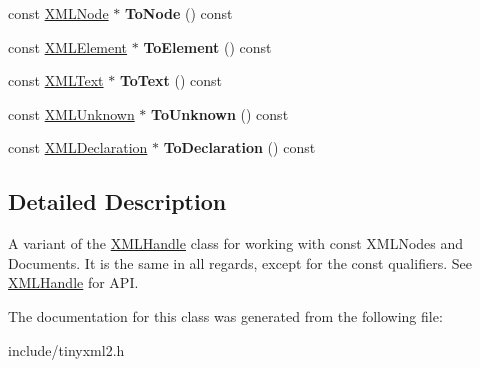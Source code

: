 \begin{DoxyCompactItemize}
\item 
\hypertarget{classtinyxml2_1_1_x_m_l_const_handle_a95d0256318c10c3f75fa5f8ffb3e4bc1}{}const \hyperlink{classtinyxml2_1_1_x_m_l_node}{X\+M\+L\+Node} $\ast$ {\bfseries To\+Node} () const \label{classtinyxml2_1_1_x_m_l_const_handle_a95d0256318c10c3f75fa5f8ffb3e4bc1}

\item 
\hypertarget{classtinyxml2_1_1_x_m_l_const_handle_a5a48adefc2a5e70d4ce5b55692a0e2f9}{}const \hyperlink{classtinyxml2_1_1_x_m_l_element}{X\+M\+L\+Element} $\ast$ {\bfseries To\+Element} () const \label{classtinyxml2_1_1_x_m_l_const_handle_a5a48adefc2a5e70d4ce5b55692a0e2f9}

\item 
\hypertarget{classtinyxml2_1_1_x_m_l_const_handle_ad86ca7dbb20d0495ae357fe7a866e0be}{}const \hyperlink{classtinyxml2_1_1_x_m_l_text}{X\+M\+L\+Text} $\ast$ {\bfseries To\+Text} () const \label{classtinyxml2_1_1_x_m_l_const_handle_ad86ca7dbb20d0495ae357fe7a866e0be}

\item 
\hypertarget{classtinyxml2_1_1_x_m_l_const_handle_acb358a329e54fa204ed2d0b181566828}{}const \hyperlink{classtinyxml2_1_1_x_m_l_unknown}{X\+M\+L\+Unknown} $\ast$ {\bfseries To\+Unknown} () const \label{classtinyxml2_1_1_x_m_l_const_handle_acb358a329e54fa204ed2d0b181566828}

\item 
\hypertarget{classtinyxml2_1_1_x_m_l_const_handle_a5de0c175845bc30a6f9b3d88d8877eaf}{}const \hyperlink{classtinyxml2_1_1_x_m_l_declaration}{X\+M\+L\+Declaration} $\ast$ {\bfseries To\+Declaration} () const \label{classtinyxml2_1_1_x_m_l_const_handle_a5de0c175845bc30a6f9b3d88d8877eaf}

\end{DoxyCompactItemize}


\subsection{Detailed Description}
A variant of the \hyperlink{classtinyxml2_1_1_x_m_l_handle}{X\+M\+L\+Handle} class for working with const X\+M\+L\+Nodes and Documents. It is the same in all regards, except for the \textquotesingle{}const\textquotesingle{} qualifiers. See \hyperlink{classtinyxml2_1_1_x_m_l_handle}{X\+M\+L\+Handle} for A\+P\+I. 

The documentation for this class was generated from the following file\+:\begin{DoxyCompactItemize}
\item 
include/tinyxml2.\+h\end{DoxyCompactItemize}

